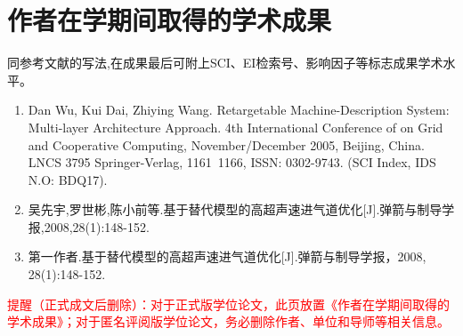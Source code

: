 %

\chapter*{作者在学期间取得的学术成果}
同参考文献的写法,在成果最后可附上SCI、EI检索号、影响因子等标志成果学术水平。

\begin{enumerate}
  \item Dan Wu, Kui Dai, Zhiying Wang. Retargetable Machine-Description System: Multi-layer Architecture Approach. 4th International Conference of on Grid and Cooperative Computing, November/December 2005, Beijing, China. LNCS 3795 Springer-Verlag, 1161~1166, ISSN: 0302-9743. (SCI Index, IDS N.O: BDQ17).
  \item 吴先宇,罗世彬,陈小前等.基于替代模型的高超声速进气道优化[J].弹箭与制导学报,2008,28(1):148-152.
  \item 第一作者.基于替代模型的高超声速进气道优化[J].弹箭与制导学报，2008, 28(1):148-152.
\end{enumerate}


\par\textcolor{red}{提醒（正式成文后删除）：对于正式版学位论文，此页放置《作者在学期间取得的学术成果》；对于匿名评阅版学位论文，务必删除作者、单位和导师等相关信息。}
